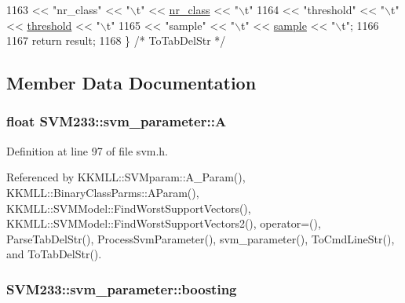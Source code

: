 \begin{DoxyCode}
1163          << \textcolor{stringliteral}{"nr\_class"}   << \textcolor{stringliteral}{"\(\backslash\)t"}  << \hyperlink{struct_s_v_m233_1_1svm__parameter_a6fa48dd0b10a8f9cbbc8c0d571404345}{nr\_class}   << \textcolor{stringliteral}{"\(\backslash\)t"}
1164          << \textcolor{stringliteral}{"threshold"}  << \textcolor{stringliteral}{"\(\backslash\)t"}  << \hyperlink{struct_s_v_m233_1_1svm__parameter_a7a43eeb6067c4ae3bf32aa151f43195a}{threshold}  << \textcolor{stringliteral}{"\(\backslash\)t"}
1165          << \textcolor{stringliteral}{"sample"}     << \textcolor{stringliteral}{"\(\backslash\)t"}  << \hyperlink{struct_s_v_m233_1_1svm__parameter_a63dd6c465973afa907155971db828985}{sample}     << \textcolor{stringliteral}{"\(\backslash\)t"};
1166 
1167   \textcolor{keywordflow}{return}  result;
1168 \}  \textcolor{comment}{/* ToTabDelStr */}
\end{DoxyCode}


\subsection{Member Data Documentation}
\subsubsection[{\texorpdfstring{A}{A}}]{\setlength{\rightskip}{0pt plus 5cm}float S\+V\+M233\+::svm\+\_\+parameter\+::A}\hypertarget{struct_s_v_m233_1_1svm__parameter_ae77c2459a4305fca375197165412abe2}{}\label{struct_s_v_m233_1_1svm__parameter_ae77c2459a4305fca375197165412abe2}


Definition at line 97 of file svm.\+h.



Referenced by K\+K\+M\+L\+L\+::\+S\+V\+Mparam\+::\+A\+\_\+\+Param(), K\+K\+M\+L\+L\+::\+Binary\+Class\+Parms\+::\+A\+Param(), K\+K\+M\+L\+L\+::\+S\+V\+M\+Model\+::\+Find\+Worst\+Support\+Vectors(), K\+K\+M\+L\+L\+::\+S\+V\+M\+Model\+::\+Find\+Worst\+Support\+Vectors2(), operator=(), Parse\+Tab\+Del\+Str(), Process\+Svm\+Parameter(), svm\+\_\+parameter(), To\+Cmd\+Line\+Str(), and To\+Tab\+Del\+Str().

\subsubsection[{\texorpdfstring{boosting}{boosting}}]{ S\+V\+M233\+::svm\+\_\+parameter\+::boosting}\hypertarget{struct_s_v_m233_1_1svm__parameter_a1c7bc0954f80166ddd404a5eb9e0ca99}{}\label{struct_s_v_m233_1_1svm__parameter_a1c7bc0954f80166ddd404a5eb9e0ca99}


